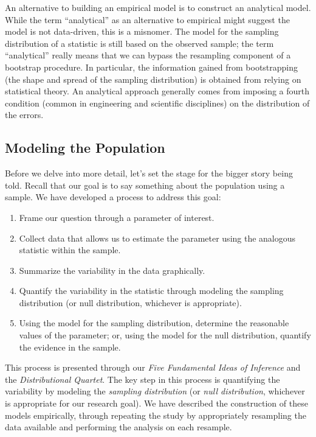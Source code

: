 \documentclass[
  letterpaper,
  DIV=11,
  numbers=noendperiod]{scrreprt}
\providecommand{\tightlist}{%
  \setlength{\itemsep}{0pt}\setlength{\parskip}{0pt}}\usepackage{longtable,booktabs,array}
\theoremstyle{definition}
\theoremstyle{definition}
\theoremstyle{plain}
\theoremstyle{remark}
\begin{document}
An alternative to building an empirical model is to construct an
analytical model. While the term ``analytical'' as an alternative to
empirical might suggest the model is not data-driven, this is a
misnomer. The model for the sampling distribution of a statistic is
still based on the observed sample; the term ``analytical'' really means
that we can bypass the resampling component of a bootstrap procedure. In
particular, the information gained from bootstrapping (the shape and
spread of the sampling distribution) is obtained from relying on
statistical theory. An analytical approach generally comes from imposing
a fourth condition (common in engineering and scientific disciplines) on
the distribution of the errors.

\subsection{Modeling the Population}\label{modeling-the-population}

Before we delve into more detail, let's set the stage for the bigger
story being told. Recall that our goal is to say something about the
population using a sample. We have developed a process to address this
goal:

\begin{enumerate}
\def\labelenumi{\arabic{enumi}.}
\tightlist
\item
  Frame our question through a parameter of interest.
\item
  Collect data that allows us to estimate the parameter using the
  analogous statistic within the sample.
\item
  Summarize the variability in the data graphically.
\item
  Quantify the variability in the statistic through modeling the
  sampling distribution (or null distribution, whichever is
  appropriate).
\item
  Using the model for the sampling distribution, determine the
  reasonable values of the parameter; or, using the model for the null
  distribution, quantify the evidence in the sample.
\end{enumerate}

This process is presented through our \emph{Five Fundamental Ideas of
Inference} and the \emph{Distributional Quartet}. The key step in this
process is quantifying the variability by modeling the \emph{sampling
distribution} (or \emph{null distribution}, whichever is appropriate for
our research goal). We have described the construction of these models
empirically, through repeating the study by appropriately resampling the
data available and performing the analysis on each resample.
\end{document}
